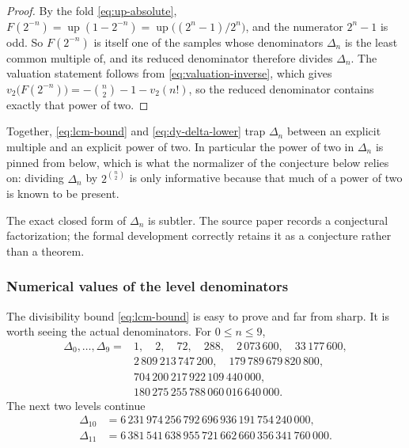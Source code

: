 \documentclass[11pt,oneside]{article}
\theoremstyle{definition}
\theoremstyle{remark}
\newcommand{\Up}{\operatorname{up}}
\newcommand{\vtwo}{v_2}
\begin{document}
\begin{proof}
By the fold \eqref{eq:up-absolute}, $F(2^{-n})=\Up(1-2^{-n})=\Up\bigl((2^n-1)/2^n\bigr)$, and
the numerator $2^n-1$ is odd.  So $F(2^{-n})$ is itself one of the samples whose denominators
$\Delta_n$ is the least common multiple of, and its reduced denominator therefore divides
$\Delta_n$.  The valuation statement follows from \eqref{eq:valuation-inverse}, which gives
$\vtwo\bigl(F(2^{-n})\bigr)=-\binom n2-1-\vtwo(n!)$, so the reduced denominator contains
exactly that power of two.
\end{proof}

Together, \eqref{eq:lcm-bound} and \eqref{eq:dy-delta-lower} trap $\Delta_n$ between an
explicit multiple and an explicit power of two.  In particular the power of two in $\Delta_n$
is pinned from below, which is what the normalizer of the conjecture below relies on: dividing
$\Delta_n$ by $2^{\binom n2}$ is only informative because that much of a power of two is known
to be present.

The exact closed form of $\Delta_n$ is subtler.  The source paper records a conjectural
factorization; the formal development correctly retains it as a conjecture rather than a
theorem.


\subsubsection{Numerical values of the level denominators}
\label{subsubsec:dy-delta-values}

The divisibility bound \eqref{eq:lcm-bound} is easy to prove and far from sharp.  It is
worth seeing the actual denominators.  For $0\le n\le9$,
\begin{equation}
\begin{split}
 \Delta_0,\ldots,\Delta_9={}&1,\quad 2,\quad 72,\quad 288,\quad 2\,073\,600,\quad
 33\,177\,600,\\
 &2\,809\,213\,747\,200,\quad 179\,789\,679\,820\,800,\\
 &704\,200\,217\,922\,109\,440\,000,\\
 &180\,275\,255\,788\,060\,016\,640\,000.
\end{split}                                                    \label{eq:dy-delta-values}
\end{equation}
The next two levels continue
\begin{equation}
\begin{split}
 \Delta_{10}&=6\,231\,974\,256\,792\,696\,936\,191\,754\,240\,000,\\
 \Delta_{11}&=6\,381\,541\,638\,955\,721\,662\,660\,356\,341\,760\,000.
\end{split}                                                    \label{eq:dy-delta-values-ext}
\end{equation}
\end{document}

